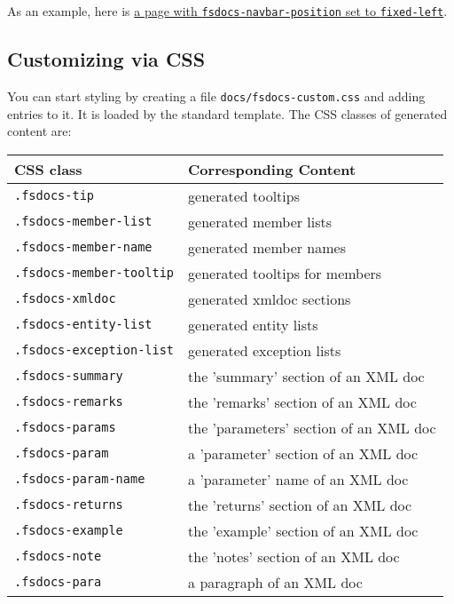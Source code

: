 \documentclass{article}
\begin{document}
As an example, here is \href{templates/leftside/styling.html}{a page with \texttt{fsdocs-navbar-position} set to \texttt{fixed-left}}.
\subsection*{Customizing via CSS}



You can start styling by creating a file \texttt{docs/fsdocs-custom.css} and adding entries to it.  It is loaded by
the standard template.  The CSS classes of generated content are:
\begin{tabular}{|l|l|}\hline
\textbf{CSS class} & \textbf{Corresponding Content}\\ \hline\hline
\texttt{.fsdocs-tip} & generated tooltips\\ \hline
\texttt{.fsdocs-member-list} & generated member lists\\ \hline
\texttt{.fsdocs-member-name} & generated member names\\ \hline
\texttt{.fsdocs-member-tooltip} & generated tooltips for members\\ \hline
\texttt{.fsdocs-xmldoc} & generated xmldoc sections\\ \hline
\texttt{.fsdocs-entity-list} & generated entity lists\\ \hline
\texttt{.fsdocs-exception-list} & generated exception lists\\ \hline
\texttt{.fsdocs-summary} & the 'summary' section of an XML doc\\ \hline
\texttt{.fsdocs-remarks} & the 'remarks' section of an XML doc\\ \hline
\texttt{.fsdocs-params} & the 'parameters' section of an XML doc\\ \hline
\texttt{.fsdocs-param} & a 'parameter' section of an XML doc\\ \hline
\texttt{.fsdocs-param-name} & a 'parameter' name of an XML doc\\ \hline
\texttt{.fsdocs-returns} & the 'returns' section of an XML doc\\ \hline
\texttt{.fsdocs-example} & the 'example' section of an XML doc\\ \hline
\texttt{.fsdocs-note} & the 'notes' section of an XML doc\\ \hline
\texttt{.fsdocs-para} & a paragraph of an XML doc\\ \hline
\end{tabular}
\end{document}
